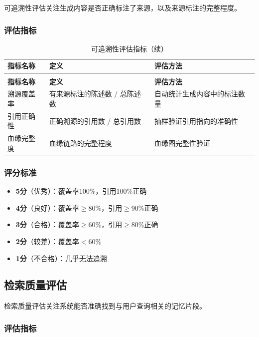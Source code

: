 \documentclass[12pt,a4paper,oneside]{article}
\begin{document}
可追溯性评估关注生成内容是否正确标注了来源，以及来源标注的完整程度。

\subsubsection{评估指标}

\begin{longtable}{p{3cm}p{4cm}p{4cm}}
    \caption{可追溯性评估指标} \\
    \toprule
    \textbf{指标名称} & \textbf{定义} & \textbf{评估方法} \\
    \midrule
    \endfirsthead
    \caption{可追溯性评估指标（续）} \\
    \toprule
    \textbf{指标名称} & \textbf{定义} & \textbf{评估方法} \\
    \midrule
    \endhead
    溯源覆盖率 & 有来源标注的陈述数 / 总陈述数 & 自动统计生成内容中的标注数量 \\
    引用正确性 & 正确溯源的引用数 / 总引用数 & 抽样验证引用指向的准确性 \\
    血缘完整度 & 血缘链路的完整程度 & 血缘图完整性验证 \\
    \bottomrule
\end{longtable}

\subsubsection{评分标准}

\begin{itemize}
    \item \textbf{5分}（优秀）：覆盖率100\%，引用100\%正确
    \item \textbf{4分}（良好）：覆盖率$\ge$80\%，引用$\ge$90\%正确
    \item \textbf{3分}（合格）：覆盖率$\ge$60\%，引用$\ge$80\%正确
    \item \textbf{2分}（较差）：覆盖率$<$60\%
    \item \textbf{1分}（不合格）：几乎无法追溯
\end{itemize}

\subsection{检索质量评估}

检索质量评估关注系统能否准确找到与用户查询相关的记忆片段。

\subsubsection{评估指标}
\end{document}

